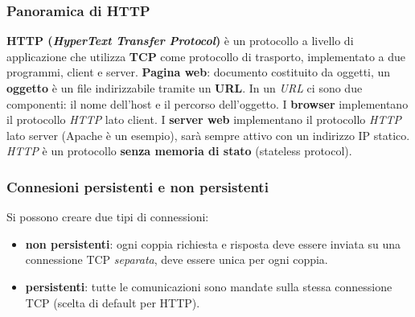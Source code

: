 \subsubsection{Panoramica di HTTP}
\textbf{HTTP (\textit{HyperText Transfer Protocol})} è un protocollo a livello di applicazione che utilizza \textbf{TCP} come protocollo di trasporto, implementato a due programmi, client e server.
\textbf{Pagina web}: documento costituito da oggetti, un \textbf{oggetto} è un file indirizzabile tramite un \textbf{URL}.
In un \textit{URL} ci sono due componenti: il nome dell'host e il percorso dell'oggetto.
I \textbf{browser} implementano il protocollo \textit{HTTP} lato client.
I \textbf{server web} implementano il protocollo \textit{HTTP} lato server (Apache è un esempio), sarà sempre attivo con un indirizzo IP statico.
\textit{HTTP} è un protocollo \textbf{senza memoria di stato} (stateless protocol).

\subsubsection{Connesioni persistenti e non persistenti}
Si possono creare due tipi di connessioni:
\begin{itemize}
  \item \textbf{non persistenti}: ogni coppia richiesta e risposta deve essere inviata su una connessione TCP \textit{separata}, deve essere unica per ogni coppia.
  \item \textbf{persistenti}: tutte le comunicazioni sono mandate sulla stessa connessione TCP (scelta di default per HTTP).
\end{itemize}

